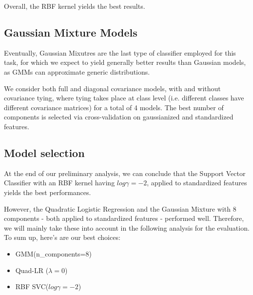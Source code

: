 Overall, the RBF kernel yields the best results.

\subsection{Gaussian Mixture Models}
Eventually, Gaussian Mixutres are the last type of classifier employed for this task, for which we expect to yield generally better results than Gaussian models, as GMMs can approximate generic distributions.

We consider both full and diagonal covariance models, with and without covariance tying, where tying takes place at class level (i.e. different classes have different covariance matrices) for a total of 4 models. The best number of components is selected via cross-validation on gaussianized and standardized features.


\subsection{Model selection}
At the end of our preliminary analysis, we can conclude that the Support Vector Classifier with an RBF kernel having $log\gamma = -2$, applied to standardized features yields the best performances. 

However, the Quadratic Logistic Regression and the Gaussian Mixture with 8 components - both applied to standardized features - performed well. Therefore, we will mainly take these into account in the following analysis for the evaluation.
To sum up, here's are our best choices:
\begin{itemize}
	\item GMM(n\_components=8)
	\item Quad-LR ($\lambda=0$)
	\item RBF SVC($log \gamma=-2$)
\end{itemize}